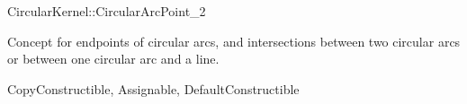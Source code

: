 \begin{ccRefConcept}{CircularKernel::CircularArcPoint_2}

\ccDefinition

Concept for endpoints of circular arcs, and intersections between two
circular arcs or between one circular arc and a line.

\ccRefines
CopyConstructible, Assignable, DefaultConstructible

\ccHasModels
{}

\end{ccRefConcept}

